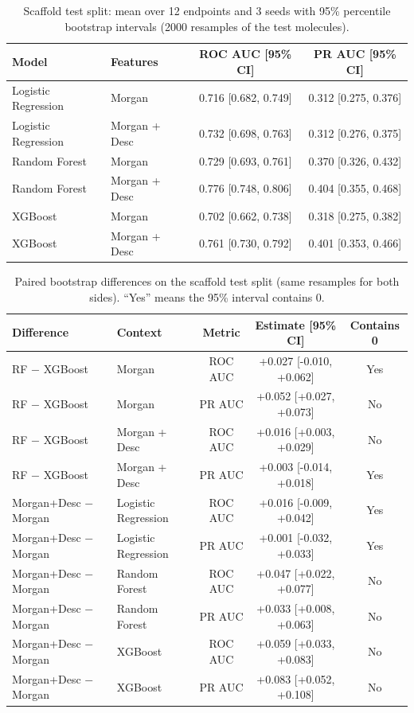 \begin{table}[t]
\caption{Scaffold test split: mean over 12 endpoints and 3 seeds with 95\% percentile bootstrap intervals (2000 resamples of the test molecules).}
\label{tab:bootstrap_ci}
\centering\small
\begin{tabular}{@{}llcc@{}}
\toprule
Model & Features & ROC AUC [95\% CI] & PR AUC [95\% CI] \\
\midrule
Logistic Regression & Morgan & 0.716 [0.682, 0.749] & 0.312 [0.275, 0.376] \\
Logistic Regression & Morgan + Desc & 0.732 [0.698, 0.763] & 0.312 [0.276, 0.375] \\
Random Forest & Morgan & 0.729 [0.693, 0.761] & 0.370 [0.326, 0.432] \\
Random Forest & Morgan + Desc & 0.776 [0.748, 0.806] & 0.404 [0.355, 0.468] \\
XGBoost & Morgan & 0.702 [0.662, 0.738] & 0.318 [0.275, 0.382] \\
XGBoost & Morgan + Desc & 0.761 [0.730, 0.792] & 0.401 [0.353, 0.466] \\
\bottomrule
\end{tabular}
\end{table}

\begin{table}[t]
\caption{Paired bootstrap differences on the scaffold test split (same resamples for both sides). ``Yes'' means the 95\% interval contains 0.}
\label{tab:bootstrap_diff}
\centering\small
\begin{tabular}{@{}llccc@{}}
\toprule
Difference & Context & Metric & Estimate [95\% CI] & Contains 0 \\
\midrule
RF $-$ XGBoost & Morgan & ROC AUC & +0.027 [-0.010, +0.062] & Yes \\
RF $-$ XGBoost & Morgan & PR AUC & +0.052 [+0.027, +0.073] & No \\
RF $-$ XGBoost & Morgan + Desc & ROC AUC & +0.016 [+0.003, +0.029] & No \\
RF $-$ XGBoost & Morgan + Desc & PR AUC & +0.003 [-0.014, +0.018] & Yes \\
Morgan+Desc $-$ Morgan & Logistic Regression & ROC AUC & +0.016 [-0.009, +0.042] & Yes \\
Morgan+Desc $-$ Morgan & Logistic Regression & PR AUC & +0.001 [-0.032, +0.033] & Yes \\
Morgan+Desc $-$ Morgan & Random Forest & ROC AUC & +0.047 [+0.022, +0.077] & No \\
Morgan+Desc $-$ Morgan & Random Forest & PR AUC & +0.033 [+0.008, +0.063] & No \\
Morgan+Desc $-$ Morgan & XGBoost & ROC AUC & +0.059 [+0.033, +0.083] & No \\
Morgan+Desc $-$ Morgan & XGBoost & PR AUC & +0.083 [+0.052, +0.108] & No \\
\bottomrule
\end{tabular}
\end{table}
